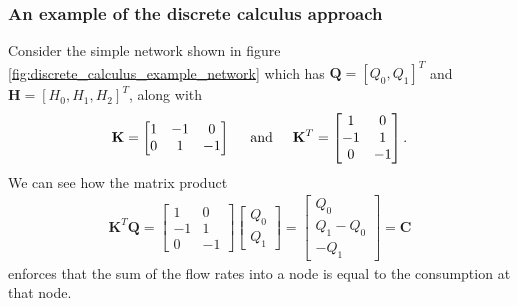 \documentclass[12pt]{article}
\begin{document}
\subsubsection{An example of the discrete calculus approach}

Consider the simple network shown in figure \ref{fig:discrete_calculus_example_network} which has $\mathbf{Q} = [Q_0, Q_1]^T$ and $\mathbf{H} = [H_0, H_1, H_2]^T$, along with
\begin{align*}
\mathbf{K} = \begin{bmatrix}
1 & -1 & 0 \\
0 & 1 & -1
\end{bmatrix}
\hspace{0.5cm} \text{and} \hspace{0.5cm} \mathbf{K}^T = \begin{bmatrix}
1 & 0  \\
-1 & 1 \\
0 & -1
\end{bmatrix}.
\end{align*}
We can see how the matrix product 
\begin{align*}
\mathbf{K}^T \mathbf{Q} = \begin{bmatrix}
1 & 0  \\
-1 & 1 \\
0 & -1
\end{bmatrix} \begin{bmatrix}
Q_0 \\ Q_1
\end{bmatrix} = \begin{bmatrix}
Q_0 \\ Q_1 - Q_0 \\ -Q_1
\end{bmatrix} = \mathbf{C}
\end{align*}
enforces that the sum of the flow rates into a node is equal to the consumption at that node. 
\end{document}
